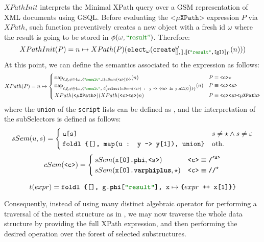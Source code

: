 \begin{definition}
 $XPathInit$ interprets the Minimal XPath query over a GSM representation of XML documents using GSQL. Before evaluating the $\texttt{<}\mu\texttt{XPath}\texttt{>}$  expression $P$ via $XPath$, such function preventively creates a new object with a fresh id $\omega$ where the result is going to be stored in $\phi(\omega,\mstr{result})$. Therefore:
\[XPathInit(P) = n\mapsto XPath(P) (\texttt{elect}_\omega(\texttt{create}^\omega_{[],[],\jsem{\texttt{\{\mstr{result},[g]\}}}_\Gamma}(n)))\]
At this point, we can define the semantics associated to the expression as follows:
\[XPath(P) = n\mapsto \begin{cases}
	\texttt{map}_{\ell,\xi,\phi\oplus \texttt{\{}\omega\texttt{,\{\mstr{result},}t(cSem(\texttt{<c>}))\texttt{\}\}} }(n) & P\equiv \texttt{<c>}\star\\
	\texttt{map}_{\ell,\xi,\phi\oplus\texttt{\{}\omega\texttt{,\{\mstr{result},}\;t\big(\texttt{select(} cSem(\texttt{<c>}) \texttt{ : y -> \{<s> in y.\textbf{ell}\})}\big)\texttt{\}}\}}(n) & P\equiv \texttt{<c>}\texttt{<s>}\\
	XPath(\texttt{<}\mu\texttt{XPath>}) (XPath(\texttt{<c><s>}) n ) & P\equiv \texttt{<c><s>}\texttt{<}\mu\texttt{XPath>}\\
\end{cases}\]
where the \texttt{union} of the \texttt{script} lists can be defined as , and the interpretation of the subSelectors is defined as follows:
\[sSem(u,s)=\begin{cases}
\texttt{u[s]} & s\neq \star\wedge s\neq \varepsilon\\
\texttt{foldl \{[], map(u : y -> y[1]), union\}} & \textup{oth.}\\
\end{cases}\]
\[cSem(\texttt{<c>})=\begin{cases}
 sSem(\texttt{x[0].\textbf{phi}},\texttt{<s>})\texttt{} & \texttt{<c>}\equiv\texttt{/}^\texttt{\texttt{<s>}}\\
 sSem(\texttt{x[0].\textbf{varphiplus}},\star)\texttt{} & \texttt{<c>}\equiv\texttt{//}^{\star}\\
\end{cases}\]

\[t(expr)=\texttt{foldl \{[], g.\textbf{phi}[\mstr{result}], x}\mapsto\texttt{\{}expr\texttt{ ++ x[1]\}\}}\]
\end{definition}

Consequently, instead of using many distinct algebraic operator for performing a traversal of the nested structure as in \cite{Magnani06}, we may now traverse the whole data structure by providing the full XPath expression, and then performing the desired operation over the forest of selected substructures.
 

